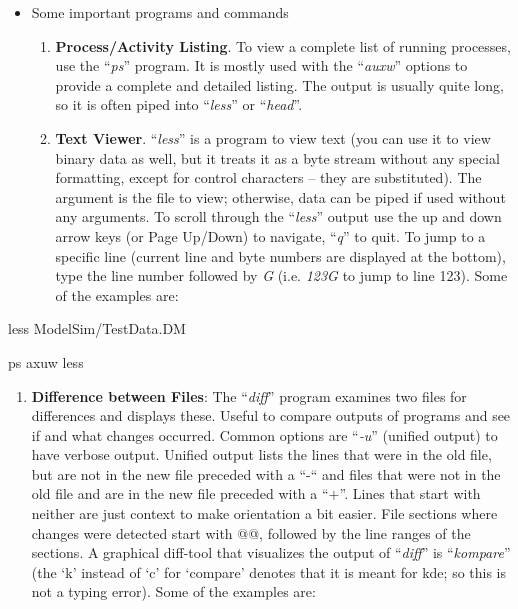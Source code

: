 \documentclass[
]{article}
\begin{document}
\begin{itemize}
\item
  Some important programs and commands

  \begin{enumerate}
  \def\labelenumi{\alph{enumi}.}
  \item
    \textbf{Process/Activity Listing}. To view a complete list of
    running processes, use the ``\emph{ps}'' program. It is mostly used
    with the ``\emph{auxw}'' options to provide a complete and detailed
    listing. The output is usually quite long, so it is often piped into
    ``\emph{less}'' or ``\emph{head}''.
  \item
    \textbf{Text Viewer}. ``\emph{less}'' is a program to view text (you
    can use it to view binary data as well, but it treats it as a byte
    stream without any special formatting, except for control characters
    -- they are substituted). The argument is the file to view;
    otherwise, data can be piped if used without any arguments. To
    scroll through the ``\emph{less}'' output use the up and down arrow
    keys (or Page Up/Down) to navigate, ``\emph{q}'' to quit. To jump to
    a specific line (current line and byte numbers are displayed at the
    bottom), type the line number followed by \emph{G} (i.e. \emph{123G}
    to jump to line 123). Some of the examples are:
  \end{enumerate}
\end{itemize}

less ModelSim/TestData.DM

ps axuw \textbar{} less

\begin{enumerate}
\def\labelenumi{\alph{enumi}.}
\setcounter{enumi}{2}
\item
  \textbf{Difference between Files}: The ``\emph{diff}'' program
  examines two files for differences and displays these. Useful to
  compare outputs of programs and see if and what changes occurred.
  Common options are ``\emph{‑u}'' (unified output) to have verbose
  output. Unified output lists the lines that were in the old file, but
  are not in the new file preceded with a ``-`` and files that were not
  in the old file and are in the new file preceded with a ``+''. Lines
  that start with neither are just context to make orientation a bit
  easier. File sections where changes were detected start with @@,
  followed by the line ranges of the sections. A graphical diff-tool
  that visualizes the output of ``\emph{diff}'' is ``\emph{kompare}''
  (the `k' instead of `c' for `compare' denotes that it is meant for
  kde; so this is not a typing error). Some of the examples are:
\end{enumerate}
\end{document}
